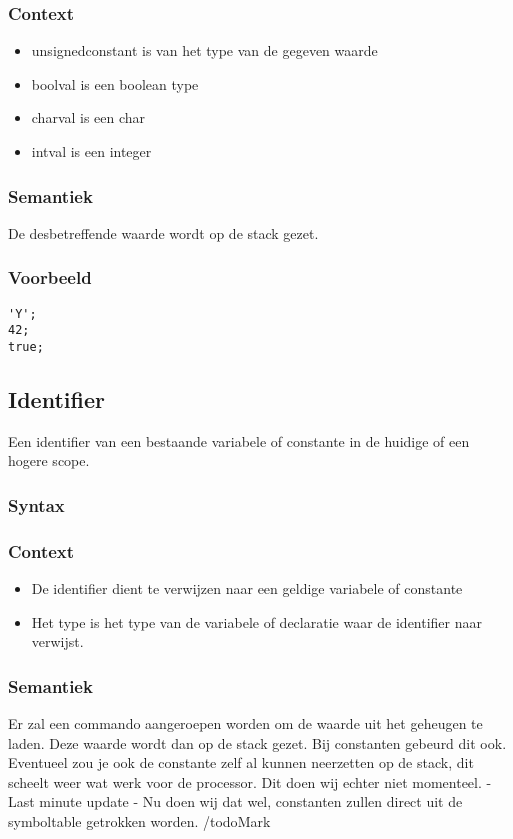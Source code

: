 \documentclass[]{article}
\begin{document}
\subsubsection{Context}
\begin{itemize}
\item unsignedconstant is van het type van de gegeven waarde
\item boolval is een boolean type
\item charval is een char
\item intval is een integer
\end{itemize}
\subsubsection{Semantiek}
De desbetreffende waarde wordt op de stack gezet.
\subsubsection{Voorbeeld}
\begin{lstlisting}[style=SELMA]
'Y';
42;
true;
\end{lstlisting}

\subsection{Identifier}
Een identifier van een bestaande variabele of constante in de huidige of een hogere scope.
\subsubsection{Syntax}

\subsubsection{Context}
\begin{itemize}
\item De identifier dient te verwijzen naar een geldige variabele of constante
\item Het type is het type van de variabele of declaratie waar de identifier naar verwijst.
\end{itemize}
\subsubsection{Semantiek}
Er zal een commando aangeroepen worden om de waarde uit het geheugen te laden. Deze waarde wordt dan op de stack gezet. Bij constanten gebeurd dit ook. Eventueel zou je ook de constante zelf al kunnen neerzetten op de stack, dit scheelt weer wat werk voor de processor. Dit doen wij echter niet momenteel. - Last minute update - Nu doen wij dat wel, constanten zullen direct uit de symboltable getrokken worden.
/todo{Mark}
\end{document}
